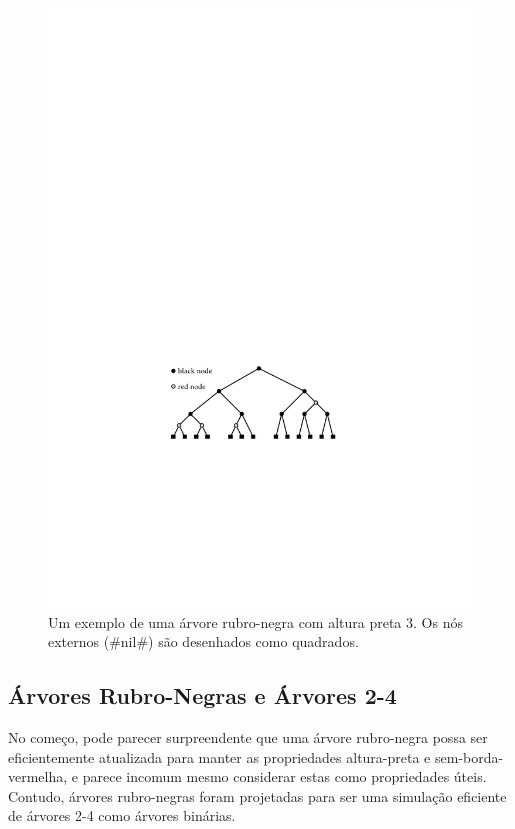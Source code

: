 \begin{figure}
	\begin{center}
		\includegraphics[scale=0.90909]{figs/24rb-1}
	\end{center}
	\caption[A red-black tree]{Um exemplo de uma árvore rubro-negra com altura preta 3. Os nós externos (#nil#) são desenhados como quadrados.}
\end{figure}


\subsection{Árvores Rubro-Negras e Árvores 2-4}

No começo, pode parecer surpreendente que uma árvore rubro-negra possa ser eficientemente
atualizada para manter as propriedades altura-preta e sem-borda-vermelha, e
parece incomum mesmo considerar estas como propriedades úteis. Contudo,
árvores rubro-negras foram projetadas para ser uma simulação eficiente de árvores 2-4
como árvores binárias.


